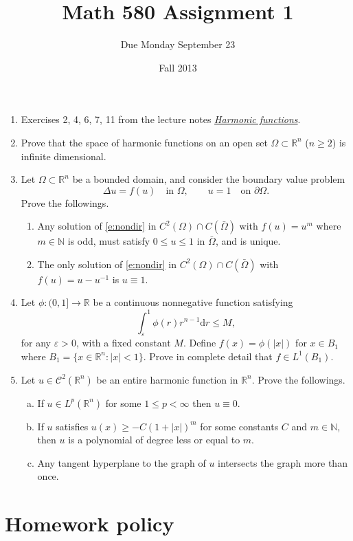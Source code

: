 \documentclass[11pt,reqno]{amsart}
\title{Math 580 Assignment 1}
\author{Due Monday September 23}
\date{Fall 2013}                                           %
\newcommand{\R}{\mathbb{R}}
\newcommand{\N}{\mathbb{N}}
\newcommand{\tstC}{\mathscr{C}}
\newcommand{\eps}{\varepsilon}
\newcommand{\exd}{\mathrm{d}}
\begin{document}
\maketitle

\begin{enumerate}[1.]
\item
Exercises 2, 4, 6, 7, 11 from the lecture notes \href{/legacy/courses/math580f13/harmonic.pdf}{\em Harmonic functions}.
\item
Prove that the space of harmonic functions on an open set $\Omega\subset\R^n$ ($n\geq2$) is infinite dimensional.
\item
Let $\Omega\subset\R^n$ be a bounded domain,
and consider the boundary value problem
\begin{equation}\label{e:nondir}\tag{$*$}
\Delta u = f(u)\quad\textrm{in }\Omega,
\qquad
u = 1\quad\textrm{on }\partial\Omega.
\end{equation}
Prove the followings.
\begin{enumerate}
\item[a)]
Any solution of \eqref{e:nondir} in $C^2(\Omega)\cap C(\bar\Omega)$ with $f(u)=u^m$ where $m\in\N$ is odd, must satisfy $0\leq u\leq 1$ in $\bar\Omega$, and is unique.
\item[b)]
The only solution of \eqref{e:nondir} in $C^2(\Omega)\cap C(\bar\Omega)$ with $f(u)=u-u^{-1}$ is $u\equiv1$.
\end{enumerate}
\item
Let $\phi:(0,1]\to\R$ be a continuous nonnegative function satisfying
$$
\int_\eps^1\phi(r)r^{n-1}\exd r \leq M,
$$
for any $\eps>0$, with a fixed constant $M$.
Define $f(x)=\phi(|x|)$ for $x\in B_1$ where $B_1=\{x\in\R^n:|x|<1\}$.
Prove in complete detail that $f\in L^1(B_1)$.
\item
Let $u\in\tstC^2(\R^n)$ be an entire harmonic function in $\R^n$.
Prove the followings.
\begin{enumerate}[(a)]
\item
If $u\in L^p(\R^n)$ for some $1\leq p<\infty$ then $u\equiv0$.
\item
If $u$ satisfies $u(x)\geq-C(1+|x|)^m$ for some constants $C$ and $m\in\mathbb{N}$,
then $u$ is a polynomial of degree less or equal to $m$.
\item
Any tangent hyperplane to the graph of $u$ intersects the graph more than once.
\end{enumerate}
\end{enumerate}

\section*{Homework policy}
\end{document}
